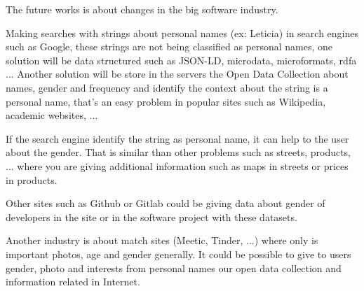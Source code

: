 \documentclass[a4paper]{article}
\begin{document}
The future works is about changes in the big software industry.

Making searches with strings about personal names (ex: Leticia) in
search engines such as Google, these strings are not being classified
as personal names, one solution will be data structured such as
JSON-LD, microdata, microformats, rdfa ... Another solution will be
store in the servers the Open Data Collection about names, gender and
frequency and identify the context about the string is a personal
name, that's an easy problem in popular sites such as Wikipedia,
academic websites, ...

If the search engine identify the string as personal name, it can help
to the user about the gender. That is similar than other problems such
as streets, products, ... where you are giving additional information
such as maps in streets or prices in products.

Other sites such as Github or Gitlab could be giving data about
gender of developers in the site or in the software project with these
datasets.

Another industry is about match sites (Meetic, Tinder, ...) where only
is important photos, age and gender generally. It could be possible to give
to users gender, photo and interests from personal names our open data
collection and information related in Internet.






\end{document}

